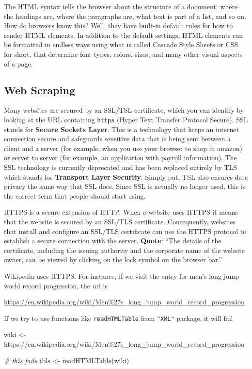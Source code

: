 \documentclass[
]{book}
\newenvironment{Shaded}{\begin{snugshade}}{\end{snugshade}}
\newcommand{\CommentTok}[1]{\textcolor[rgb]{0.56,0.35,0.01}{\textit{#1}}}
\newcommand{\FunctionTok}[1]{\textcolor[rgb]{0.00,0.00,0.00}{#1}}
\newcommand{\NormalTok}[1]{#1}
\newcommand{\OtherTok}[1]{\textcolor[rgb]{0.56,0.35,0.01}{#1}}
\newcommand{\StringTok}[1]{\textcolor[rgb]{0.31,0.60,0.02}{#1}}
\begin{document}
The HTML syntax tells the browser about the structure of a document: where
the headings are, where the paragraphs are, what text is part of a list, and
so on. How do browsers know this? Well, they have built-in default rules
for how to render HTML elements. In addition to the default settings, HTML
elements can be formatted in endless ways using what is called Cascade
Style Sheets or CSS for short, that determine font types, colors, sizes, and
many other visual aspects of a page.

\hypertarget{web-scraping}{%
\subsection{Web Scraping}\label{web-scraping}}

Many websites are secured by an SSL/TSL certificate, which you can identify by
looking at the URL containing \texttt{https} (Hyper Text Transfer Protocol Secure).
SSL stands for \textbf{Secure Sockets Layer}. This is a technology that
keeps an internet connection secure and safeguards sensitive data that is being
sent between a client and a server (for example, when you use your browser
to shop in amazon) or server to server (for example, an application with
payroll information). The SSL technology is currently deprecated and has been
replaced entirely by TLS which stands for \textbf{Transport Layer Security}. Simply
put, TSL also ensures data privacy the same way that SSL does. Since SSL is
actually no longer used, this is the correct term that people should start using.

HTTPS is a secure extension of HTTP. When a website uses HTTPS it means that
the website is secured by an SSL/TLS certificate. Consequently, websites that
install and configure an SSL/TLS certificate can use the HTTPS protocol to
establish a secure connection with the server.
\textbf{Quote}: ``The details of the certificate, including the issuing
authority and the corporate name of the website owner, can be viewed by
clicking on the lock symbol on the browser bar.''

Wikipedia uses HTTPS. For instance, if we visit the entry for men's long jump
world record progression, the url is

\url{https://en.wikipedia.org/wiki/Men\%27s_long_jump_world_record_progression}

If we try to use functions like \texttt{readHTMLTable} from \texttt{"XML"} package, it will
fail

\begin{Shaded}
\begin{Highlighting}[]
\NormalTok{wiki }\OtherTok{\textless{}{-}} \StringTok{\textquotesingle{}https://en.wikipedia.org/wiki/Men\%27s\_long\_jump\_world\_record\_progression\textquotesingle{}}

\CommentTok{\# this fails}
\NormalTok{tbls }\OtherTok{\textless{}{-}} \FunctionTok{readHTMLTable}\NormalTok{(wiki)}
\end{Highlighting}
\end{Shaded}
\end{document}
